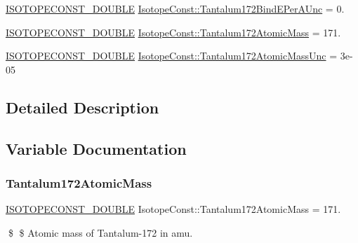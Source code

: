 \begin{DoxyCompactItemize}
\mbox{\hyperlink{group___isotope_const-_macros_ga8f45a7272ce02c0b4c65c44636ed719a}{I\+S\+O\+T\+O\+P\+E\+C\+O\+N\+S\+T\+\_\+\+D\+O\+U\+B\+LE}} \mbox{\hyperlink{group___isotope_const-_tantalum-_ta172_ga688fa0b9eef0416af242fcc1461f0e16}{Isotope\+Const\+::\+Tantalum172\+Bind\+E\+Per\+A\+Unc}} = 0.
\item 
\mbox{\hyperlink{group___isotope_const-_macros_ga8f45a7272ce02c0b4c65c44636ed719a}{I\+S\+O\+T\+O\+P\+E\+C\+O\+N\+S\+T\+\_\+\+D\+O\+U\+B\+LE}} \mbox{\hyperlink{group___isotope_const-_tantalum-_ta172_ga2f1231a629b37a81729b037e9200632a}{Isotope\+Const\+::\+Tantalum172\+Atomic\+Mass}} = 171.
\item 
\mbox{\hyperlink{group___isotope_const-_macros_ga8f45a7272ce02c0b4c65c44636ed719a}{I\+S\+O\+T\+O\+P\+E\+C\+O\+N\+S\+T\+\_\+\+D\+O\+U\+B\+LE}} \mbox{\hyperlink{group___isotope_const-_tantalum-_ta172_ga44346ddf68b8a5a414a7cbd51506e325}{Isotope\+Const\+::\+Tantalum172\+Atomic\+Mass\+Unc}} = 3e-\/05
\end{DoxyCompactItemize}


\subsection{Detailed Description}


\subsection{Variable Documentation}
\mbox{\label{group___isotope_const-_tantalum-_ta172_ga2f1231a629b37a81729b037e9200632a}} 
\subsubsection{\texorpdfstring{Tantalum172\+Atomic\+Mass}{Tantalum172AtomicMass}}
{\footnotesize\ttfamily \mbox{\hyperlink{group___isotope_const-_macros_ga8f45a7272ce02c0b4c65c44636ed719a}{I\+S\+O\+T\+O\+P\+E\+C\+O\+N\+S\+T\+\_\+\+D\+O\+U\+B\+LE}} Isotope\+Const\+::\+Tantalum172\+Atomic\+Mass = 171.}

\$ \$ Atomic mass of Tantalum-\/172 in amu. \mbox{\label{group___isotope_const-_tantalum-_ta172_ga44346ddf68b8a5a414a7cbd51506e325}} 
